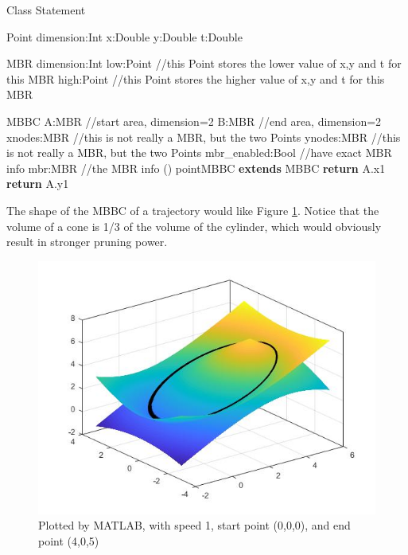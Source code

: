 \documentclass[sigplan]{acmart}
\begin{document}
\begin{algorithm}[ht]
\caption{Class Statement} \label{alg:class}



\begin{algorithmic}[0]
\Ensure Point
    \State dimension:Int
    \State x:Double
    \State y:Double
    \State t:Double

\Ensure MBR
    \State dimension:Int
    \State low:Point //this Point stores the lower value of x,y and t for this MBR
    \State high:Point //this Point stores the higher value of x,y and t for this MBR

\Ensure MBBC
    \State A:MBR //start area, dimension=2
    \State B:MBR //end area, dimension=2
    \State xnodes:MBR //this is not really a MBR, but the two Points 
    \State ynodes:MBR //this is not really a MBR, but the two Points 
    \State mbr\_enabled:Bool //have exact MBR info
    \State mbr:MBR //the MBR info
    ()
    \EndFunction
\Ensure pointMBBC \textbf{extends} MBBC
    \State \textbf{return} A.x1
    \EndFunction
    \State \textbf{return} A.y1
    \EndFunction
\end{algorithmic}
\end{algorithm}

The shape of the MBBC of a trajectory would like Figure \ref{fig:matlab}. Notice that the volume of a cone is 1/3 of the volume of the cylinder, which would obviously result in stronger pruning power.\\
\begin{figure}[ht]
  \centering
  \includegraphics[width=\linewidth]{matlab.jpg}
  \caption{Plotted by MATLAB, with speed 1, start point (0,0,0), and end point (4,0,5)}
  \label{fig:matlab}
\end{figure}
\end{document}
